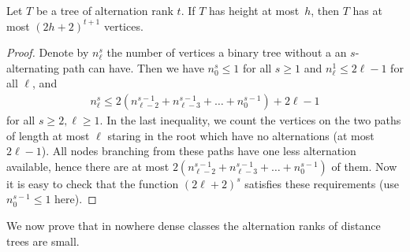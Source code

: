 \begin{lemma}\label{lem:number-of-nodes}
Let $T$ be a tree of alternation rank $t$. If
$T$ has height at most~$h$, then $T$ has at most $(2h+2)^{t+1}$
vertices. 
\end{lemma}
\begin{proof}
Denote by $n_\ell^s$ the number of vertices a binary tree without a 
an $s$-alternating path can have. Then we have $n_0^s\leq 1$ for all $s\geq 1$
and $n_\ell^1\leq 2\ell-1$ for all $\ell$, and 
\begin{align*}
n_\ell^s\leq 2(n_{\ell-2}^{s-1}+n_{\ell-3}^{s-1}+\ldots + n_{0}^{s-1})+2\ell-1
\end{align*}
for all $s\geq 2,\ell\geq 1$. In the last inequality, we count the vertices on 
the two paths of length at most 
$\ell$ staring in the root which have no alternations (at most $2\ell-1$). 
All nodes branching from 
these paths have one less alternation available, hence there are at most
$ 2(n_{\ell-2}^{s-1}+n_{\ell-3}^{s-1}+\ldots + n_{0}^{s-1})$ of them. 
Now it is easy to check that the function $(2\ell+2)^s$ satisfies these requirements (use $n_0^{s-1}\leq 1$ here). 
\end{proof}

We now prove that in nowhere dense classes the alternation ranks of 
distance trees are small. 

